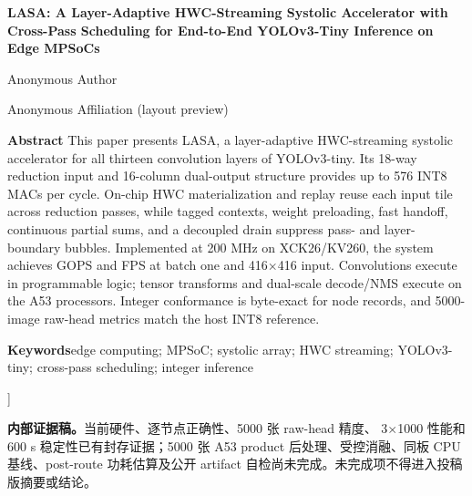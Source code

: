 \documentclass[10.5pt,compsoc,UTF8]{CjC}
\newcommand{\LASA}{\textsc{LASA}}
\begin{document}
\begin{minipage}{\textwidth}
\vskip 3mm
\begin{center}
{\bfseries
LASA: A Layer-Adaptive HWC-Streaming Systolic Accelerator with\\[1mm]
Cross-Pass Scheduling for End-to-End YOLOv3-Tiny Inference on Edge MPSoCs\par}
\vspace{3mm}
{Anonymous Author\par}
{Anonymous Affiliation (layout preview)\par}
\end{center}

\vspace{1mm}
\noindent\textbf{Abstract}\quad
This paper presents \LASA, a layer-adaptive HWC-streaming systolic accelerator
for all thirteen convolution layers of YOLOv3-tiny. Its 18-way reduction input
and 16-column dual-output structure provides up to 576 INT8 MACs per cycle.
On-chip HWC materialization and replay reuse each input tile across reduction
passes, while tagged contexts, weight preloading, fast handoff, continuous
partial sums, and a decoupled drain suppress pass- and layer-boundary bubbles.
Implemented at 200 MHz on XCK26/KV260, the system achieves
\PLEffectiveGOPS{} GOPS and \ResidentFPS{} FPS at batch one and
416$\times$416 input. Convolutions execute in programmable logic; tensor
transforms and dual-scale decode/NMS execute on the A53 processors. Integer
conformance is byte-exact for \NodeRecords{} node records, and 5000-image
raw-head metrics match the host INT8 reference.\par

\vspace{2mm}
\noindent\textbf{Keywords}\quad edge computing; MPSoC; systolic array;
HWC streaming; YOLOv3-tiny; cross-pass scheduling; integer inference\par
\vspace{2mm}
\end{minipage}
]
\flushend

\noindent\colorbox{LasaPending}{\parbox{0.96\linewidth}{\centering{}
\textbf{内部证据稿。}当前硬件、逐节点正确性、5000 张 raw-head 精度、
3$\times$1000 性能和 600 s 稳定性已有封存证据；5000 张 A53 product
后处理、受控消融、同板 CPU 基线、post-route 功耗估算及公开 artifact
自检尚未完成。未完成项不得进入投稿版摘要或结论。}}










\end{document}
